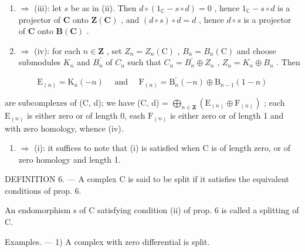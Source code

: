 \begin{enumerate}
\def\labelenumi{(\roman{enumi})}
\setcounter{enumi}{1}
\item
  \(\Rightarrow\) (iii): let \(s\) be as in (ii). Then \(d \circ (1_{\mathbb{C}} - s \circ d) = 0\) , hence \(1_{\mathbb{C}} - s \circ d\) is a projector of \(\mathbf{C}\) onto \(\mathbf{Z}(\mathbf{C})\) , and \((d \circ s) \circ d = d\) , hence \(d \circ s\) is a projector of \(\mathbf{C}\) onto \(\mathbf{B}(\mathbf{C})\) .
\item
  \(\Rightarrow\) (iv): for each \(n\in\mathbf{Z}\) , set \(Z_{n}=Z_{n}(\mathrm{C})\) , \(B_{n}=B_{n}(\mathrm{C})\) and choose submodules \(K_{n}\) and \(B_{n}^{\prime}\) of \(C_{n}\) such that \(C_{n}=B_{n}^{\prime}\oplus Z_{n}\) , \(Z_{n}=K_{n}\oplus B_{n}\) . Then
\end{enumerate}

\[
\mathrm{E} _ {(n)} = \mathrm{K} _ {n} (- n) \quad \text { and } \quad \mathrm{F} _ {(n)} = \mathrm{B} _ {n} ^ {\prime} (- n) \oplus \mathrm{B} _ {n - 1} (1 - n)
\]

are subcomplexes of (C, d); we have (C, d) = \(\bigoplus_{n \in \mathbf{Z}} (\mathrm{E}_{(n)} \oplus \mathrm{F}_{(n)})\) ; each \(\mathrm{E}_{(n)}\) is either zero or of length 0, each \(\mathrm{F}_{(n)}\) is either zero or of length 1 and with zero homology, whence (iv).

\begin{enumerate}
\def\labelenumi{(\roman{enumi})}
\setcounter{enumi}{3}
\tightlist
\item
  \(\Rightarrow\) (i): it suffices to note that (i) is satisfied when C is of length zero, or of zero homology and length 1.
\end{enumerate}

DEFINITION 6. --- A complex C is said to be split if it satisfies the equivalent conditions of prop. 6.

An endomorphism s of C satisfying condition (ii) of prop. 6 is called a splitting of C.

Examples. --- 1) A complex with zero differential is split.

